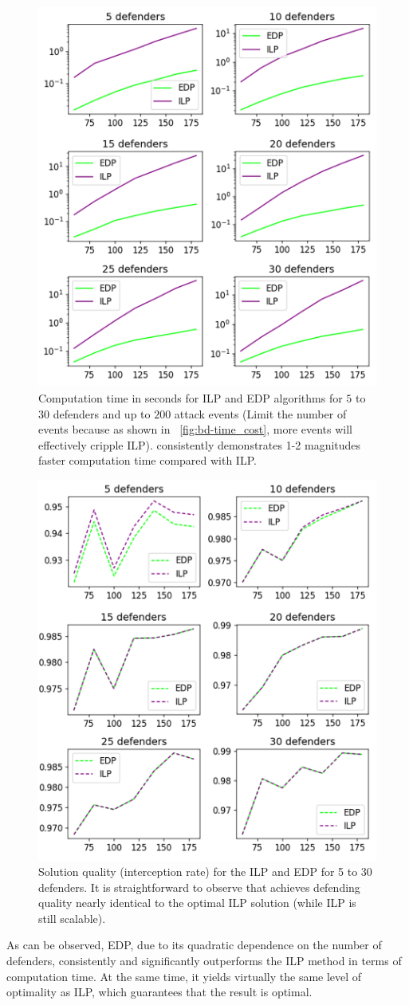 \begin{figure}[h!]
    \centering
    \includegraphics[width=.5\linewidth]{chapters/bd/fig/def_timecost-v.png}
    \caption{Computation time in seconds for ILP and EDP algorithms for $5$ to $30$ defenders and up to $200$ 
    attack events (Limit the number of events because as shown in ~\ref{fig:bd-time_cost}, 
    more events will effectively cripple ILP). \ours consistently demonstrates 1-2 magnitudes faster computation time compared with ILP.}
    \label{fig:bd-def_time_cost}
\end{figure}

\begin{figure}[h!]
    \centering
    \includegraphics[width=.5\linewidth]{chapters/bd/fig/def_quality-v.png}
    \caption{Solution quality (interception rate) for the ILP and EDP for 5 to 30 defenders. 
    It is straightforward to observe that \ours achieves defending quality nearly identical to the optimal ILP solution (while ILP is still scalable).}
    \label{fig:bd-def_quality}
\end{figure}

As can be observed, EDP, due to its quadratic dependence on the number of defenders, consistently and significantly outperforms the ILP method in terms of computation time. At the same time, it yields virtually the same level of optimality as ILP, which guarantees that the result is optimal. 

